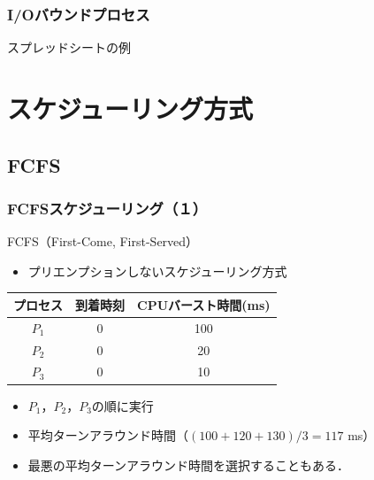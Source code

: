 \documentclass[unicode,handout]{beamer}                   %
\begin{document}
\begin{frame}
  \frametitle{I/Oバウンドプロセス}
  スプレッドシートの例\\
  \vfill
  \vfill
\end{frame}

\section{スケジューリング方式}
\subsection{FCFS}
\begin{frame}
  \frametitle{FCFSスケジューリング（１）}
  FCFS（First-Come, First-Served）
  \vfill
  \begin{itemize}
    \item プリエンプションしないスケジューリング方式
  \end{itemize}
  \vfill
  \small\begin{tabular}{c c c}
    プロセス & 到着時刻 & CPUバースト時間(ms) \\
    \hline
    $P_1$    & 0 & 100 \\
    $P_2$    & 0 & 20 \\
    $P_3$    & 0 & 10 \\
  \end{tabular}
  \vfill
  \vfill
  \begin{itemize}
    \item $P_1$，$P_2$，$P_3$の順に実行
    \item 平均ターンアラウンド時間（$(100+120+130) / 3 = 117$ ms）
    \item 最悪の平均ターンアラウンド時間を選択することもある．
  \end{itemize}
  \vfill
\end{frame}
\end{document}
